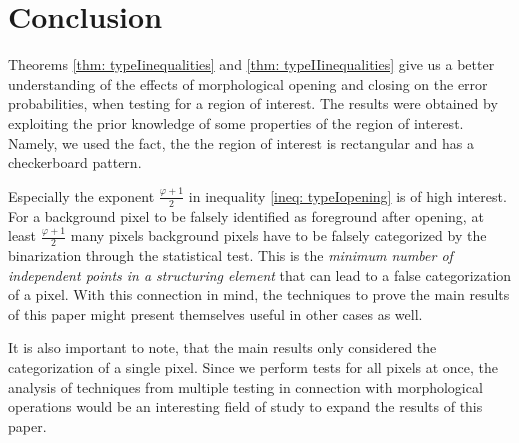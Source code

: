 \documentclass[a4paper,12pt]{article}
\theoremstyle{plain}
\theoremstyle{definition}
\begin{document}
\newpage

\section{Conclusion}\label{section: conclusion}

Theorems \ref{thm: typeIinequalities} and \ref{thm: typeIIinequalities} give us a better understanding of the effects of morphological opening and closing on the error probabilities, when testing for a region of interest. The results were obtained by exploiting the prior knowledge of some properties of the region of interest. Namely, we used the fact, the the region of interest is rectangular and has a checkerboard pattern.

Especially the exponent $\frac{\varphi + 1}{2}$ in inequality \eqref{ineq: typeIopening} is of high interest. For a background pixel to be falsely identified as foreground after opening, at least $\frac{\varphi + 1}{2}$ many pixels background pixels have to be falsely categorized by the binarization through the statistical test. This is the \emph{minimum number of independent points in a structuring element} that can lead to a false categorization of a pixel. With this connection in mind, the techniques to prove the main results of this paper might present themselves useful in other cases as well.

It is also important to note, that the main results only considered the categorization of a single pixel. Since we perform tests for all pixels at once, the analysis of techniques from multiple testing in connection with morphological operations would be an interesting field of study to expand the results of this paper.

\newpage
\end{document}
